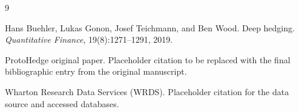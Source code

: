\documentclass[11pt]{article}
\begin{document}
\begin{thebibliography}{9}

Hans Buehler, Lukas Gonon, Josef Teichmann, and Ben Wood.
\newblock Deep hedging.
\newblock \emph{Quantitative Finance}, 19(8):1271--1291, 2019.

ProtoHedge original paper.
\newblock Placeholder citation to be replaced with the final bibliographic entry from the original manuscript.

Wharton Research Data Services (WRDS).
\newblock Placeholder citation for the data source and accessed databases.

\end{thebibliography}
\end{document}
